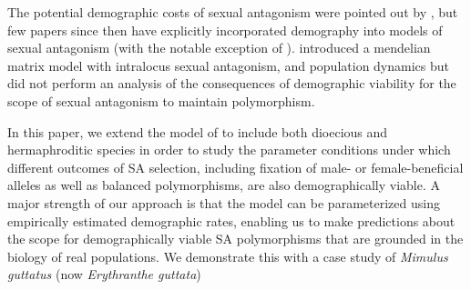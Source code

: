 \documentclass[11pt]{article}
\begin{document}
The potential demographic costs of sexual antagonism were pointed out by \cite{kokko2003sexy}, but few papers since then have explicitly incorporated demography into models of sexual antagonism (with the notable exception of \citealt{harts2014demography}). \citet{deVriesCaswell2019a} introduced a mendelian matrix model with intralocus sexual antagonism, and population dynamics but did not perform an analysis of the consequences of demographic viability for the scope of sexual antagonism to maintain polymorphism. 

In this paper, we extend the model of \citep{deVriesCaswell2019a,deVriesCaswell2019b} to include both dioecious and hermaphroditic species in order to study the parameter conditions under which different outcomes of SA selection, including fixation of male- or female-beneficial alleles as well as balanced polymorphisms, are also demographically viable. A major strength of our approach is that the model can be parameterized using empirically estimated demographic rates, enabling us to make predictions about the scope for demographically viable SA polymorphisms that are grounded in the biology of real populations. We demonstrate this with a case study of {\itshape Mimulus guttatus} (now {\itshape Erythranthe guttata})





\end{document}
